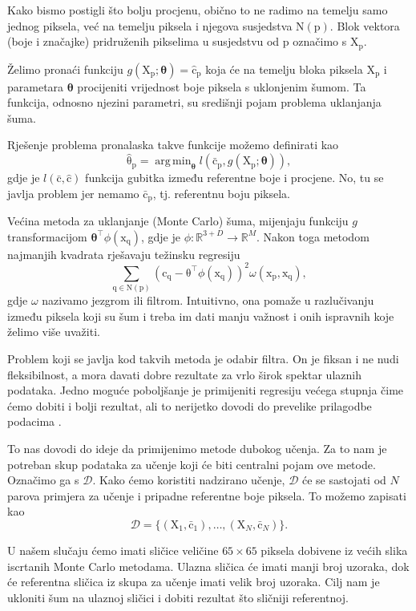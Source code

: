 \documentclass[times, utf8, seminar, numeric]{fer}
\DeclareMathOperator*{\argmin}{arg\,min}
\newcommand{\vect}[1]{\bm{\mathrm{#1}}}
\begin{document}
Kako bismo postigli što bolju procjenu, obično to ne radimo na temelju samo jednog piksela, već
na temelju piksela i njegova susjedstva $\mathrm{N}(\vect{p})$. Blok vektora (boje i značajke)
pridruženih pikselima u susjedstvu od $\vect{p}$ označimo s $\vect{X_p}$.

Želimo pronaći funkciju $g(\vect{X_p}; \bm{\theta})=\vect{\hat{c}_p}$ koja će na temelju bloka
piksela $\vect{X_p}$ i parametara $\bm{\theta}$ procijeniti vrijednost boje piksela s uklonjenim
šumom. Ta funkcija, odnosno njezini parametri, su središnji pojam problema uklanjanja šuma.

Rješenje problema pronalaska takve funkcije možemo definirati kao
$$ \vect{\hat{\theta}_p} = \argmin_{\bm{\theta}} l(\vect{\bar{c}_p}, g(\vect{X_p}; \bm{\theta})), $$
gdje je $l(\vect{\bar{c}}, \vect{\hat{c}})$ funkcija gubitka između referentne boje i procjene.
No, tu se javlja problem jer nemamo $\vect{\bar{c}_p}$, tj. referentnu boju piksela.

Većina metoda za uklanjanje (Monte Carlo) šuma, mijenjaju
funkciju $g$ transformacijom $\bm{\theta}^\intercal\phi(\vect{x_q})$, gdje je $\phi: \mathbb{R}^{3+D}
\to \mathbb{R}^{M}$. Nakon toga metodom najmanjih kvadrata rješavaju težinsku regresiju
$$ \sum_{\vect{q} \in \mathrm{N(\vect{p})}}(\vect{c_q} - \vect{\theta}^\intercal\phi(\vect{x_q}))^2
\omega(\vect{x_p}, \vect{x_q}), $$
gdje $\omega$ nazivamo jezgrom ili filtrom. Intuitivno, ona pomaže u razlučivanju između piksela
koji su šum i treba im dati manju važnost i onih ispravnih koje želimo više uvažiti.

Problem koji se javlja kod takvih metoda je odabir filtra. On je fiksan i ne nudi fleksibilnost, a
mora davati dobre rezultate za vrlo širok spektar ulaznih podataka. Jedno moguće poboljšanje je
primijeniti regresiju većega stupnja čime ćemo dobiti i bolji rezultat, ali to nerijetko dovodi
do prevelike prilagodbe podacima .

To nas dovodi do ideje da primijenimo metode dubokog učenja. Za to nam je potreban skup podataka
za učenje koji će biti centralni pojam ove metode. Označimo ga s $\mathcal{D}$. Kako ćemo
koristiti nadzirano učenje, $\mathcal{D}$ će se sastojati od $N$ parova primjera za učenje i
pripadne referentne boje piksela. To možemo zapisati kao
$$ \mathcal{D} = \{ (\vect{X}_1, \vect{\bar{c}}_1), \ldots, (\vect{X}_N, \vect{\bar{c}}_N) \}. $$

U našem slučaju ćemo imati sličice  veličine $65\times65$ piksela dobivene iz većih
slika iscrtanih Monte Carlo metodama. Ulazna sličica će imati manji broj uzoraka, dok će
referentna sličica iz skupa za učenje imati velik broj uzoraka. Cilj nam je ukloniti šum na
ulaznoj sličici i dobiti rezultat što sličniji referentnoj.
\end{document}
